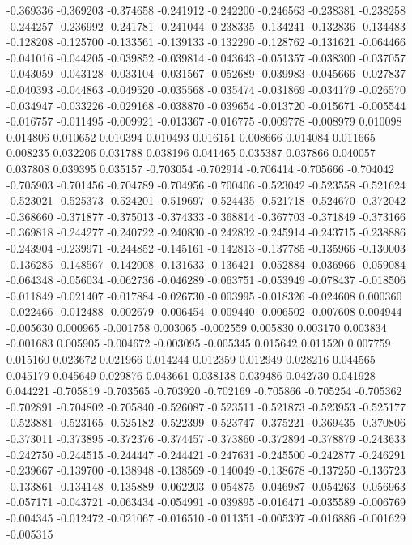 -0.369336
-0.369203
-0.374658
-0.241912
-0.242200
-0.246563
-0.238381
-0.238258
-0.244257
-0.236992
-0.241781
-0.241044
-0.238335
-0.134241
-0.132836
-0.134483
-0.128208
-0.125700
-0.133561
-0.139133
-0.132290
-0.128762
-0.131621
-0.064466
-0.041016
-0.044205
-0.039852
-0.039814
-0.043643
-0.051357
-0.038300
-0.037057
-0.043059
-0.043128
-0.033104
-0.031567
-0.052689
-0.039983
-0.045666
-0.027837
-0.040393
-0.044863
-0.049520
-0.035568
-0.035474
-0.031869
-0.034179
-0.026570
-0.034947
-0.033226
-0.029168
-0.038870
-0.039654
-0.013720
-0.015671
-0.005544
-0.016757
-0.011495
-0.009921
-0.013367
-0.016775
-0.009778
-0.008979
0.010098
0.014806
0.010652
0.010394
0.010493
0.016151
0.008666
0.014084
0.011665
0.008235
0.032206
0.031788
0.038196
0.041465
0.035387
0.037866
0.040057
0.037808
0.039395
0.035157
-0.703054
-0.702914
-0.706414
-0.705666
-0.704042
-0.705903
-0.701456
-0.704789
-0.704956
-0.700406
-0.523042
-0.523558
-0.521624
-0.523021
-0.525373
-0.524201
-0.519697
-0.524435
-0.521718
-0.524670
-0.372042
-0.368660
-0.371877
-0.375013
-0.374333
-0.368814
-0.367703
-0.371849
-0.373166
-0.369818
-0.244277
-0.240722
-0.240830
-0.242832
-0.245914
-0.243715
-0.238886
-0.243904
-0.239971
-0.244852
-0.145161
-0.142813
-0.137785
-0.135966
-0.130003
-0.136285
-0.148567
-0.142008
-0.131633
-0.136421
-0.052884
-0.036966
-0.059084
-0.064348
-0.056034
-0.062736
-0.046289
-0.063751
-0.053949
-0.078437
-0.018506
-0.011849
-0.021407
-0.017884
-0.026730
-0.003995
-0.018326
-0.024608
0.000360
-0.022466
-0.012488
-0.002679
-0.006454
-0.009440
-0.006502
-0.007608
0.004944
-0.005630
0.000965
-0.001758
0.003065
-0.002559
0.005830
0.003170
0.003834
-0.001683
0.005905
-0.004672
-0.003095
-0.005345
0.015642
0.011520
0.007759
0.015160
0.023672
0.021966
0.014244
0.012359
0.012949
0.028216
0.044565
0.045179
0.045649
0.029876
0.043661
0.038138
0.039486
0.042730
0.041928
0.044221
-0.705819
-0.703565
-0.703920
-0.702169
-0.705866
-0.705254
-0.705362
-0.702891
-0.704802
-0.705840
-0.526087
-0.523511
-0.521873
-0.523953
-0.525177
-0.523881
-0.523165
-0.525182
-0.522399
-0.523747
-0.375221
-0.369435
-0.370806
-0.373011
-0.373895
-0.372376
-0.374457
-0.373860
-0.372894
-0.378879
-0.243633
-0.242750
-0.244515
-0.244447
-0.244421
-0.247631
-0.245500
-0.242877
-0.246291
-0.239667
-0.139700
-0.138948
-0.138569
-0.140049
-0.138678
-0.137250
-0.136723
-0.133861
-0.134148
-0.135889
-0.062203
-0.054875
-0.046987
-0.054263
-0.056963
-0.057171
-0.043721
-0.063434
-0.054991
-0.039895
-0.016471
-0.035589
-0.006769
-0.004345
-0.012472
-0.021067
-0.016510
-0.011351
-0.005397
-0.016886
-0.001629
-0.005315

